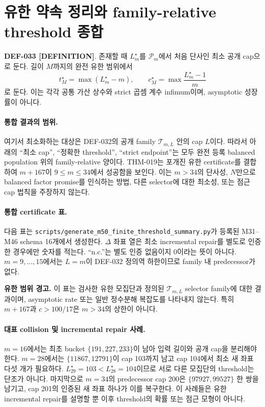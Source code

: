 \documentclass[11pt]{article}
\newcommand{\claimstatus}[2]{\textbf{#1 [#2]}}
\begin{document}
\section{유한 약속 정리와 family-relative threshold 종합}

\claimstatus{DEF-033}{DEFINITION}.
존재할 때 \(L_m^\star\)를 \(\mathcal P_m\)에서 처음 단사인 최소 공개
cap으로 둔다. 길이 \(M\)까지의 완전 유한 범위에서
\[
t_M^\star=\max(L_m^\star-m),\qquad
c_M^\star=\max\frac{L_m^\star-1}{m}
\]
로 둔다. 이는 각각 공통 가산 상수와 strict 곱셈 계수 infimum이며,
asymptotic 성장률이 아니다.

\paragraph{통합 결과의 범위.}
여기서 최소화하는 대상은 DEF-032의 공개 family
\(\mathcal T_{m,L}\) 안의 cap \(L\)이다. 따라서 아래의 ``최소 cap'',
``정확한 threshold'', ``strict endpoint''는 모두 완전 등록 balanced
population 위의 family-relative 양이다. THM-019는 포개진 유한
certificate를 결합하여 \(m+167\)이 \(9\le m\le34\)에서 성공함을
보인다. 이는 \(m>34\)의 단사성, \(N\)만으로 balanced factor promise를
인식하는 방법, 다른 selector에 대한 최소성, 또는 점근 cap 법칙을
주장하지 않는다.

\paragraph{통합 certificate 표.}
다음 표는
\texttt{scripts/generate\_m50\_finite\_threshold\_summary.py}가 등록된
M31--M46 schema 16개에서 생성한다. \(\Delta\) 좌표 열은 최소
incremental repair를 별도로 인증한 경우에만 숫자를 적는다.
``n.c.''는 별도 인증 없음이지 0이라는 뜻이 아니다.
\(m=9,\ldots,15\)에서는 \(L=m\)이 DEF-032 정의역 하한이므로 family
내 predecessor가 없다.



\noindent\textbf{유한 범위 경고.}
이 표는 검사한 유한 모집단과 정의된
\(\mathcal T_{m,L}\) selector family에 대한 결과이며, asymptotic
rate 또는 일반 정수분해 복잡도를 나타내지 않는다. 특히
\(m+167\)과 \(c>100/17\)은 \(m>34\)의 상한이 아니다.

\paragraph{대표 collision 및 incremental repair 사례.}
\(m=16\)에서는 최초 bucket \(\{191,227,233\}\)이 남아 입력 길이와
공개 cap을 분리해야 한다. \(m=28\)에서는
\(\{11867,12791\}\)이 cap 103까지 남고 cap 104에서 최소 새 좌표
다섯 개가 필요하다. \(L_{29}^{\star}=103<L_{28}^{\star}=104\)이므로
서로 다른 모집단의 threshold는 단조가 아니다. 마지막으로
\(m=34\)의 predecessor cap 200은 \(\{97927,99527\}\) 한 쌍을 남기고,
cap 201의 인증된 새 좌표 하나가 이를 복구한다. 이 사례들은 유한
incremental repair를 설명할 뿐 이후 threshold의 확률 또는 점근
모형이 아니다.
\end{document}
